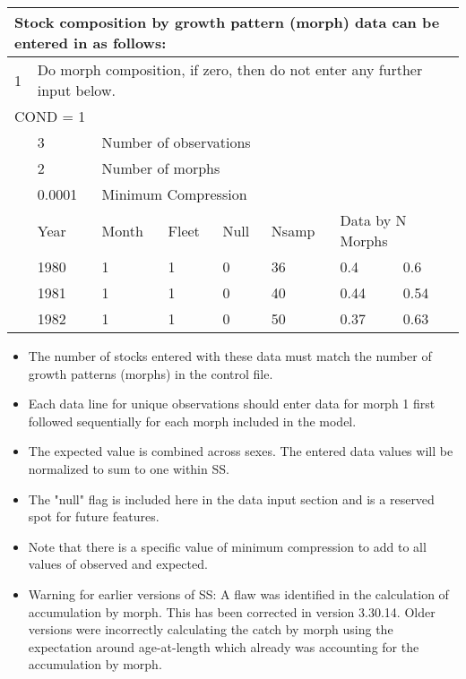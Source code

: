 \begin{center}
	\begin{tabular}{p{1.1cm} p{1.1cm} p{1.1cm} p{1.1cm} p{1.1cm} p{1.1cm} p{1.1cm} p{3.5cm}}
		\multicolumn{8}{l}{Stock composition by growth pattern (morph) data can be entered in as follows:}\\
		\hline
		1 &  \multicolumn{7}{l}{Do morph composition, if zero, then do not enter any further input below.}\Tstrut\Bstrut\\
		\hline
		\multicolumn{8}{l}{COND = 1}\Tstrut\\ 
		& 3 & \multicolumn{6}{l}{Number of observations}\Bstrut\\
		\hline
		& 2 & \multicolumn{6}{l}{Number of morphs}\Tstrut\Bstrut\\
		\hline
		& 0.0001 & \multicolumn{6}{l}{Minimum Compression}\Tstrut\Bstrut\\
		\hline
		& Year & Month & Fleet & Null & Nsamp & \multicolumn{2}{l}{Data by N Morphs} \Tstrut\Bstrut\\
		\hline
		& 1980 & 1 & 1 & 0 & 36 & 0.4 & 0.6 \Tstrut\\
		& 1981 & 1 & 1 & 0 & 40 & 0.44 & 0.54 \\
		& 1982 & 1 & 1 & 0 & 50 & 0.37 & 0.63 \Bstrut\\
		\hline
	\end{tabular}
\end{center}

	\begin{itemize}
		\item The number of stocks entered with these data must match the number of growth patterns (morphs) in the control file.
		\item Each data line for unique observations should enter data for morph 1 first followed sequentially for each morph included in the model.
		\item The expected value is combined across sexes. The entered data values will be normalized to sum to one within SS.
		\item The "null" flag is included here in the data input section and is a reserved spot for future features. 
		\item Note that there is a specific value of minimum compression to add to all values of observed and expected.
		\item Warning for earlier versions of SS: A flaw was identified in the calculation of accumulation by morph. This has been corrected in version 3.30.14.  Older versions were incorrectly calculating the catch by morph using the expectation around age-at-length which already was accounting for the accumulation by morph.   
	\end{itemize}

